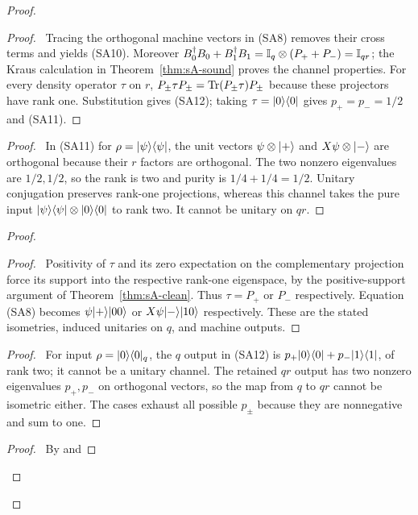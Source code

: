 \begin{proof}
 \begin{proof}\pf\ Tracing the orthogonal machine vectors in
 (SA8) removes their cross terms and yields (SA10).
 Moreover $B_0^\dagger B_0+B_1^\dagger B_1
 =\mathbb{I}_q\otimes(P_++P_-)=\mathbb{I}_{qr}$; the Kraus calculation in
 Theorem~\ref{thm:sA-sound} proves the channel properties.
 For every density operator $\tau$ on $r$,
 $P_\pm\tau P_\pm=\operatorname{Tr}(P_\pm\tau)P_\pm$ because these
 projectors have rank one. Substitution gives (SA12); taking
 $\tau=\lvert 0\rangle\langle 0\rvert$ gives $p_+=p_-=1/2$ and (SA11).
 \end{proof}
 \begin{proof}\pf\ In (SA11) for $\rho=\lvert \psi\rangle\langle \psi\rvert$, the unit
 vectors $\psi\otimes\lvert +\rangle$ and $X\psi\otimes\lvert -\rangle$ are
 orthogonal because their $r$ factors are orthogonal. The two nonzero
 eigenvalues are $1/2,1/2$, so the rank is two and purity is
 $1/4+1/4=1/2$. Unitary conjugation preserves rank-one projections,
 whereas this channel takes the pure input $\lvert \psi\rangle\langle \psi\rvert\otimes\lvert 0\rangle\langle 0\rvert$
 to rank two. It cannot be unitary on $qr$.
 \end{proof}
 \begin{proof}
  \begin{proof}\pf\ Positivity of $\tau$ and its zero expectation
 on the complementary projection force its support into the respective
 rank-one eigenspace, by the positive-support argument of
 Theorem~\ref{thm:sA-clean}. Thus $\tau=P_+$ or $P_-$ respectively.
 Equation (SA8) becomes $\psi\lvert +\rangle\lvert 00\rangle$ or
 $X\psi\lvert -\rangle\lvert 10\rangle$ respectively. These are the stated isometries,
 induced unitaries on $q$, and machine outputs.
  \end{proof}
  \begin{proof}\pf\ For input $\rho=\lvert 0\rangle\langle 0\rvert_q$, the $q$ output
  in (SA12) is $p_+\lvert 0\rangle\langle 0\rvert+p_-\lvert 1\rangle\langle 1\rvert$, of rank two; it cannot
  be a unitary channel. The retained $qr$ output has two nonzero
  eigenvalues $p_+,p_-$ on orthogonal vectors, so the map from $q$
  to $qr$ cannot be isometric either. The cases exhaust all possible
  $p_\pm$ because they are nonnegative and sum to one.
  \end{proof}
  \qedstep
  \begin{proof}\pf\ By  and

\end{proof}
\end{proof}
\end{proof}
